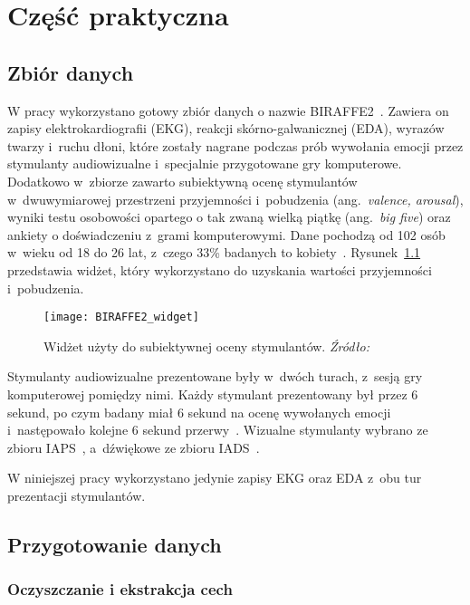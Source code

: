 \chapter{Część praktyczna}\label{ch:czesc-praktyczna}

\section{Zbiór danych}\label{sec:zbior-danych}

W pracy wykorzystano gotowy zbiór danych o nazwie BIRAFFE2~\cite{Kutt2022}.
Zawiera on zapisy elektrokardiografii (EKG), reakcji skórno-galwanicznej (EDA), wyrazów twarzy i~ruchu dłoni, które zostały nagrane podczas prób wywołania emocji przez stymulanty audiowizualne i~specjalnie przygotowane gry komputerowe.
Dodatkowo w~zbiorze zawarto subiektywną ocenę stymulantów w~dwuwymiarowej przestrzeni przyjemności i~pobudzenia (ang.~\textit{valence, arousal}), wyniki testu osobowości opartego o tak zwaną wielką piątkę (ang.~\textit{big five}) oraz ankiety o doświadczeniu z~grami komputerowymi.
Dane pochodzą od 102 osób w~wieku od 18 do 26 lat, z~czego 33\% badanych to kobiety~\cite{Kutt2022}.
Rysunek~\ref{fig:BIRAFFE2-widget} przedstawia widżet, który wykorzystano do uzyskania wartości przyjemności i~pobudzenia.

\begin{figure}[h]
    \centering
    \texttt{[image: BIRAFFE2\_widget]}
    \caption{Widżet użyty do subiektywnej oceny stymulantów. \textit{Źródło:~\cite{Kutt2022}}}
    \label{fig:BIRAFFE2-widget}
\end{figure}

Stymulanty audiowizualne prezentowane były w~dwóch turach, z~sesją gry komputerowej pomiędzy nimi.
Każdy stymulant prezentowany był przez 6 sekund, po czym badany miał 6 sekund na ocenę wywołanych emocji i~następowało kolejne 6 sekund przerwy~\cite{Kutt2022}.
Wizualne stymulanty wybrano ze zbioru IAPS~\cite{IAPS}, a~dźwiękowe ze zbioru IADS~\cite{IADS}.

W niniejszej pracy wykorzystano jedynie zapisy EKG oraz EDA z~obu tur prezentacji stymulantów.

\section{Przygotowanie danych}\label{sec:przygotowanie-danych}

\subsection{Oczyszczanie i ekstrakcja cech}\label{subsec:oczyszczanie-i-ekstrakcja-cech}

